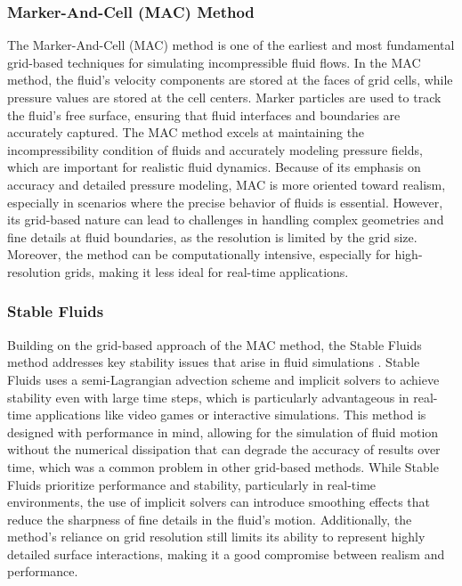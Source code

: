 \subsubsection{Marker-And-Cell (MAC) Method}

The Marker-And-Cell (MAC) method is one of the earliest and most fundamental grid-based techniques for simulating incompressible fluid flows. In the MAC method, the fluid's velocity components are stored at the faces of grid cells, while pressure values are stored at the cell centers. Marker particles are used to track the fluid's free surface, ensuring that fluid interfaces and boundaries are accurately captured. The MAC method excels at maintaining the incompressibility condition of fluids and accurately modeling pressure fields, which are important for realistic fluid dynamics. Because of its emphasis on accuracy and detailed pressure modeling, MAC is more oriented toward realism, especially in scenarios where the precise behavior of fluids is essential. However, its grid-based nature can lead to challenges in handling complex geometries and fine details at fluid boundaries, as the resolution is limited by the grid size. Moreover, the method can be computationally intensive, especially for high-resolution grids, making it less ideal for real-time applications.

\subsubsection{Stable Fluids}

Building on the grid-based approach of the MAC method, the Stable Fluids method addresses key stability issues that arise in fluid simulations \cite{Stam1999}. Stable Fluids uses a semi-Lagrangian advection scheme and implicit solvers to achieve stability even with large time steps, which is particularly advantageous in real-time applications like video games or interactive simulations. This method is designed with performance in mind, allowing for the simulation of fluid motion without the numerical dissipation that can degrade the accuracy of results over time, which was a common problem in other grid-based methods. While Stable Fluids prioritize performance and stability, particularly in real-time environments, the use of implicit solvers can introduce smoothing effects that reduce the sharpness of fine details in the fluid's motion. Additionally, the method's reliance on grid resolution still limits its ability to represent highly detailed surface interactions, making it a good compromise between realism and performance.

